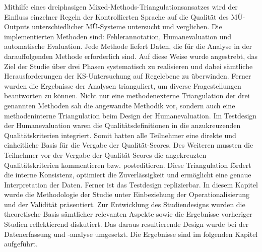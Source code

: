 Mithilfe eines dreiphasigen Mixed-Methods-Triangulationsansatzes wird der Einfluss einzelner Regeln der Kontrollierten Sprache auf die Qualität des MÜ-Out\-puts unterschiedlicher MÜ-Systeme untersucht und verglichen. Die implementierten Methoden sind: Fehlerannotation, Humanevaluation und automatische Evaluation. Jede Methode liefert Daten, die für die Analyse in der darauffolgenden Methode erforderlich sind. Auf diese Weise wurde angestrebt, das Ziel der Studie über drei Phasen systematisch zu realisieren und dabei sämtliche Herausforderungen der KS-Untersuchung auf Regelebene zu überwinden. Ferner wurden die Ergebnisse der Analysen trianguliert, um diverse Fragestellungen beantworten zu können. Nicht nur eine methodenexterne Triangulation der drei genannten Methoden sah die angewandte Methodik vor, sondern auch eine methodeninterne Triangulation beim Design der Humanevaluation. Im Testdesign der Humanevaluation waren die Qualitätsdefinitionen in die anzukreuzenden Qualitätskriterien integriert. Somit hatten alle Teilnehmer eine direkte und einheitliche Basis für die Vergabe der Qualität-Scores. Des Weiteren mussten die Teilnehmer vor der Vergabe der Qualität-Scores die angekreuzten Qualitätskriterien kommentieren bzw. posteditieren. Diese Triangulation fördert die interne Konsistenz, optimiert die Zuverlässigkeit und ermöglicht eine genaue Interpretation der Daten. Ferner ist das Testdesign replizierbar. In diesem Kapitel wurde die Methodologie der Studie unter Einbeziehung der Operationalisierung und der Validität präsentiert. Zur Entwicklung des Studiendesigns wurden die theoretische Basis sämtlicher relevanten Aspekte sowie die Ergebnisse vorheriger Studien reflektierend diskutiert. Das daraus resultierende Design wurde bei der Datenerfassung und -analyse umgesetzt. Die Ergebnisse sind im folgenden Kapitel aufgeführt.
